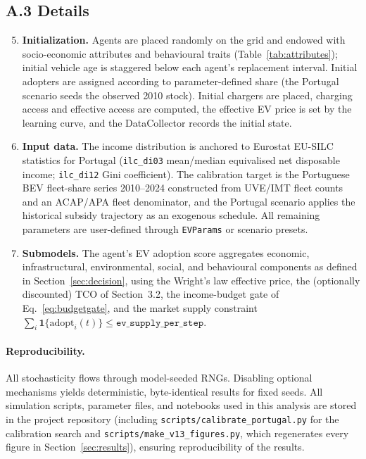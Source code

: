 \documentclass[11pt]{article}
\begin{document}
\subsection*{A.3 Details}

\begin{enumerate}
\setcounter{enumi}{4}
\item \textbf{Initialization.} Agents are placed randomly on the grid and
  endowed with socio-economic attributes and behavioural traits
  (Table~\ref{tab:attributes}); initial vehicle age is staggered below each
  agent's replacement interval. Initial adopters are assigned according to
  parameter-defined share (the Portugal scenario seeds the observed 2010
  stock). Initial chargers are placed, charging access and effective access
  are computed, the effective EV price is set by the learning curve, and
  the DataCollector records the initial state.

\item \textbf{Input data.} The income distribution is anchored to Eurostat
  EU-SILC statistics for Portugal (\texttt{ilc\_di03} mean/median
  equivalised net disposable income; \texttt{ilc\_di12} Gini coefficient).
  The calibration target is the Portuguese BEV fleet-share series
  2010--2024 constructed from UVE/IMT fleet counts and an ACAP/APA fleet
  denominator, and the Portugal scenario applies the historical subsidy
  trajectory as an exogenous schedule. All remaining parameters are
  user-defined through \texttt{EVParams} or scenario presets.

\item \textbf{Submodels.} The agent's EV adoption score aggregates
  economic, infrastructural, environmental, social, and behavioural
  components as defined in Section~\ref{sec:decision}, using the Wright's
  law effective price, the (optionally discounted) TCO of
  Section~3.2, the income-budget gate of Eq.~\eqref{eq:budgetgate}, and
  the market supply constraint
  $\sum_i \mathbf{1}\{\mathrm{adopt}_i(t)\} \leq
  \texttt{ev\_supply\_per\_step}$.
\end{enumerate}

\paragraph{Reproducibility.} All stochasticity flows through model-seeded
RNGs. Disabling optional mechanisms yields deterministic, byte-identical
results for fixed seeds. All simulation scripts, parameter files, and
notebooks used in this analysis are stored in the project repository
(including \texttt{scripts/calibrate\_portugal.py} for the calibration
search and \texttt{scripts/make\_v13\_figures.py}, which regenerates every
figure in Section~\ref{sec:results}), ensuring reproducibility of the
results.
\end{document}
